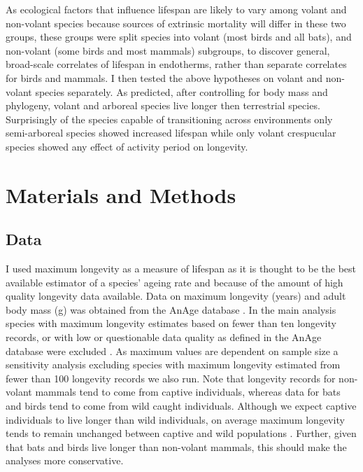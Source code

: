 As ecological factors that influence lifespan are likely to vary among volant and non-volant species because sources of extrinsic mortality will differ in these two groups, these groups were split species into volant (most birds and all bats), and non-volant (some birds and most mammals) subgroups, to discover general, broad-scale correlates of lifespan in endotherms, rather than separate correlates for birds and mammals. I then tested the above hypotheses on volant and non-volant species separately. As predicted, after controlling for body mass and phylogeny, volant and arboreal species live longer then terrestrial species. Surprisingly of the species capable of transitioning across environments only semi-arboreal species showed increased lifespan while only volant crespucular species showed any effect of activity period on longevity.

\section{Materials and Methods}
\subsection{Data}

I used maximum longevity as a measure of lifespan as it is thought to be the best available estimator of a species' ageing rate \citep{de2007analysis} and because of the amount of high quality longevity data available. Data on maximum longevity (years) and adult body mass (g) was obtained from the AnAge database \citep{de2009database,tacutu2012human}. In the main analysis species with maximum longevity estimates based on fewer than ten longevity records, or with low or questionable data quality as defined in the AnAge database were excluded \citep{de2007analysis}. As maximum values are dependent on sample size a sensitivity analysis excluding species with maximum longevity estimated from fewer than 100 longevity records we also run. Note that longevity records for non-volant mammals tend to come from captive individuals, whereas data for bats and birds tend to come from wild caught individuals. Although we expect captive individuals to live longer than wild individuals, on average maximum longevity tends to remain unchanged between captive and wild populations \cite{ricklefs2001comparison}. Further, given that bats and birds live longer than non-volant mammals, this should make the analyses more conservative. 

